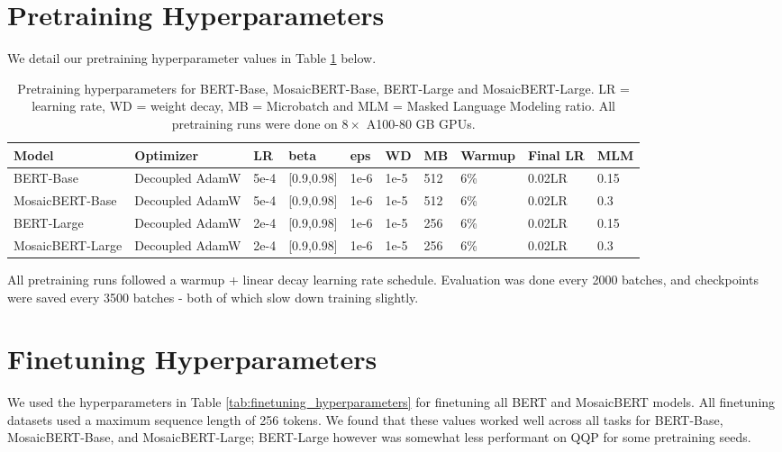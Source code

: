 
\section{Pretraining Hyperparameters} 

We detail our pretraining hyperparameter values in Table \ref{tab:pretrain_hyperparams} below.

\begin{table}[!ht]
\centering
\begin{tabular}{p{2cm} p{1.5cm} p{0.7cm} p{1.2cm} p{0.6cm} p{0.6cm} p{0.6cm} p{1cm} p{1.4cm} p{0.8cm} }\\

\toprule
Model & Optimizer & LR & beta & eps & WD & MB & Warmup & Final LR & MLM \\
\midrule
BERT-Base & Decoupled AdamW & 5e-4 & [0.9,0.98] & 1e-6 & 1e-5 & 512 & 6\% & 0.02LR & 0.15 \\
MosaicBERT-Base & Decoupled AdamW & 5e-4 & [0.9,0.98] & 1e-6 & 1e-5 & 512 & 6\% & 0.02LR  & 0.3 \\
BERT-Large & Decoupled AdamW & 2e-4 & [0.9,0.98] & 1e-6 & 1e-5 & 256 & 6\% & 0.02LR  & 0.15 \\
MosaicBERT-Large & Decoupled AdamW & 2e-4 & [0.9,0.98] & 1e-6 & 1e-5 & 256 & 6\% & 0.02LR & 0.3 \\
\bottomrule

\end{tabular}

\caption{Pretraining hyperparameters for BERT-Base, MosaicBERT-Base, BERT-Large and MosaicBERT-Large. LR = learning rate, WD = weight decay, MB = Microbatch and MLM = Masked Language Modeling ratio. All pretraining runs were done on $8\times$ A100-80 GB GPUs.}
\label{tab:pretrain_hyperparams}
\end{table}

All pretraining runs followed a warmup + linear decay learning rate schedule. Evaluation was done every 2000 batches, and checkpoints were saved every 3500 batches - both of which slow down training slightly.




\section{Finetuning Hyperparameters}

We used the hyperparameters in Table \ref{tab:finetuning_hyperparameters} for finetuning all BERT and MosaicBERT models.
All finetuning datasets used a maximum sequence length of 256 tokens. 
We found that these values worked well across all tasks for BERT-Base, MosaicBERT-Base, and MosaicBERT-Large; BERT-Large however was somewhat less performant on QQP for some pretraining seeds.


